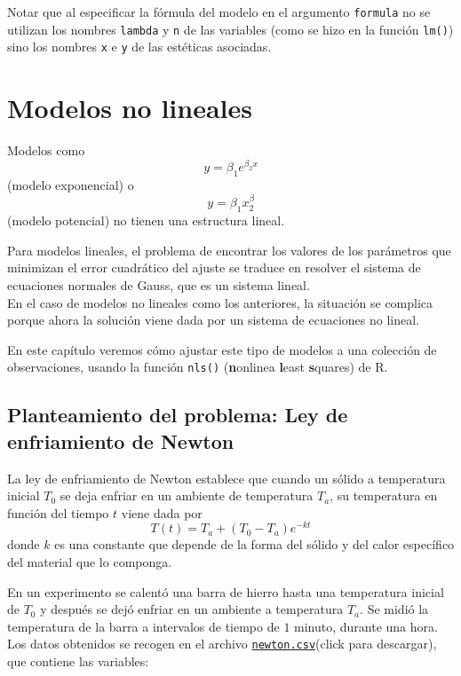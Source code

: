 \documentclass[
  degree=mecinf,
  title=normal,
  toc=normal,
  bib=normal]{mnye}
\begin{document}
Notar que al especificar la fórmula del modelo en el argumento \texttt{formula} no se utilizan los nombres \texttt{lambda} y \texttt{n} de las variables (como se hizo en la función \texttt{lm()}) sino los nombres \texttt{x} e \texttt{y} de las estéticas asociadas.

\hypertarget{nls}{%
\section{Modelos no lineales}\label{nls}}

Modelos como
\[y = \beta_1 e^{\beta_2 x}\]
(modelo exponencial) o
\[y = \beta_1x^\beta_2\]
(modelo potencial) no tienen una estructura lineal.

Para modelos lineales, el problema de encontrar los valores de los parámetros que minimizan el error cuadrático del ajuste se traduce en resolver el sistema de ecuaciones normales de Gauss, que es un sistema lineal.\\
En el caso de modelos no lineales como los anteriores, la situación se complica porque ahora la solución viene dada por un sistema de ecuaciones no lineal.

En este capítulo veremos cómo ajustar este tipo de modelos a una colección de observaciones, usando la función \texttt{nls()} (\textbf{n}onlinea \textbf{l}east \textbf{s}quares) de \textsf{R}.

\hypertarget{planteamiento-del-problema-ley-de-enfriamiento-de-newton}{%
\subsection{Planteamiento del problema: Ley de enfriamiento de Newton}\label{planteamiento-del-problema-ley-de-enfriamiento-de-newton}}

La ley de enfriamiento de Newton establece que cuando un sólido a temperatura inicial \(T_0\) se deja enfriar en un ambiente de temperatura \(T_a\), su temperatura en función del tiempo \(t\) viene dada por
\[T(t)=T_a+(T_0-T_a)e^{-kt}\]
donde \(k\) es una constante que depende de la forma del sólido y del calor específico del material que lo componga.

En un experimento se calentó una barra de hierro hasta una temperatura inicial de \(T_0\) y después se dejó enfriar en un ambiente a temperatura \(T_a\). Se midió la temperatura de la barra a intervalos de tiempo de \(1\) minuto, durante una hora. Los datos obtenidos se recogen en el archivo \href{https://drive.google.com/uc?export=download\&id=1mpF0_lZVw-u2SlrxJDwczEI4x_OxO1W2}{\texttt{newton.csv}}(click para descargar), que contiene las variables:
\end{document}
